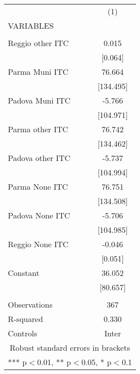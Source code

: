 \begin{tabular}{lc} \hline
 & (1) \\
VARIABLES &  \\ \hline
 &  \\
Reggio other ITC & 0.015 \\
 & [0.064] \\
Parma Muni ITC & 76.664 \\
 & [134.495] \\
Padova Muni ITC & -5.766 \\
 & [104.971] \\
Parma other ITC & 76.742 \\
 & [134.462] \\
Padova other ITC & -5.737 \\
 & [104.994] \\
Parma None ITC & 76.751 \\
 & [134.508] \\
Padova None ITC & -5.706 \\
 & [104.985] \\
Reggio None ITC & -0.046 \\
 & [0.051] \\
Constant & 36.052 \\
 & [80.657] \\
 &  \\
Observations & 367 \\
R-squared & 0.330 \\
 Controls & Inter \\ \hline
\multicolumn{2}{c}{ Robust standard errors in brackets} \\
\multicolumn{2}{c}{ *** p$<$0.01, ** p$<$0.05, * p$<$0.1} \\
\end{tabular}
